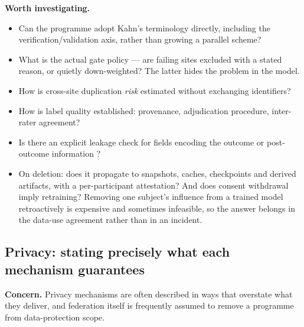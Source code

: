 \documentclass[11pt,a4paper]{article}
\newcommand{\concern}[1]{\par\medskip\noindent\textbf{Concern.} #1}
\newcommand{\investigate}{\par\smallskip\noindent\textbf{Worth investigating.}}
\begin{document}
\investigate
\begin{itemize}
  \item Can the programme adopt Kahn's terminology directly, including the
  verification/validation axis, rather than growing a parallel scheme?
  \item What is the actual gate policy --- are failing sites excluded with a
  stated reason, or quietly down-weighted? The latter hides the problem in
  the model.
  \item How is cross-site duplication \emph{risk} estimated without
  exchanging identifiers?
  \item How is label quality established: provenance, adjudication
  procedure, inter-rater agreement?
  \item Is there an explicit leakage check for fields encoding the outcome
  or post-outcome information \citep{kapoor2023leakage}?
  \item On deletion: does it propagate to snapshots, caches, checkpoints and
  derived artifacts, with a per-participant attestation? And does consent
  withdrawal imply retraining? Removing one subject's influence from a
  trained model retroactively is expensive and sometimes infeasible, so the
  answer belongs in the data-use agreement rather than in an incident.
\end{itemize}

\subsection{Privacy: stating precisely what each mechanism guarantees}
\label{sec:privacy}

\concern{Privacy mechanisms are often described in ways that overstate what
they deliver, and federation itself is frequently assumed to remove a
programme from data-protection scope.}
\end{document}

